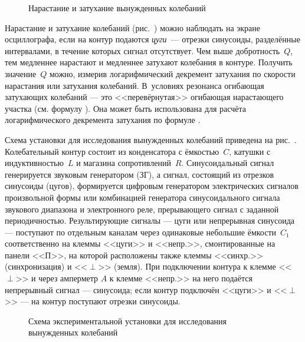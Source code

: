 \begin{figure}[h!]
    \centering
    \caption{Нарастание и затухание вынужденных колебаний}
\end{figure}

Нарастание и затухание колебаний (рис.~) 
можно наблюдать на экране осциллографа, если на контур подаются \emph{цуги}~--- 
отрезки синусоиды, разделённые интервалами, в течение которых сигнал отсутствует.
Чем выше добротность~$Q$, тем медленнее нарастают и медленнее затухают колебания 
в контуре. Получить значение~$Q$ можно, измерив логарифмический декремент 
затухания по скорости нарастания или затухания колебаний. В~условиях резонанса 
огибающая затухающих колебаний --- это <<перевёрнутая>> огибающая нарастающего 
участка (см. формулу ).
Она может быть использована для расчёта логарифмического декремента затухания
по формуле .


\experiment 

Схема установки для исследования вынужденных колебаний приведена 
на рис.~. 
Колебательный контур состоит из конденсатора с ёмкостью~$C$, 
катушки с индуктивностью~$L$ и магазина сопротивлений~$R$. 
Синусоидальный сигнал генерируется звуковым генератором (ЗГ), 
а сигнал, состоящий из отрезков синусоиды (цугов), формируется цифровым 
генератором электрических сигналов произвольной формы или комбинацией 
генератора синусоидального сигнала звукового диапазона и электронного реле, 
прерывающего сигнал с заданной периодичностью. Результирующие сигналы ---
цуги или непрерывная синусоида --- поступают по отдельным каналам через 
одинаковые небольшие ёмкости~$C_1$ соответственно на клеммы 
<<цуги>> и <<непр.>>, смонтированные на панели <<П>>, 
на которой расположены также клеммы <<синхр.>> (синхронизация) 
и <<$\perp$>> (земля). При подключении контура к клемме <<$\perp$>> 
и через амперметр $A$ к клемме <<непр.>> на него подаётся непрерывный 
сигнал --- синусоида; если контур подключён <<цуги>> и <<$\perp$>> --- 
на контур поступают отрезки синусоиды.

\begin{figure}[h!]
    \centering\small	
    \caption{Схема экспериментальной установки для исследования вынужденных
        колебаний}
\end{figure}

